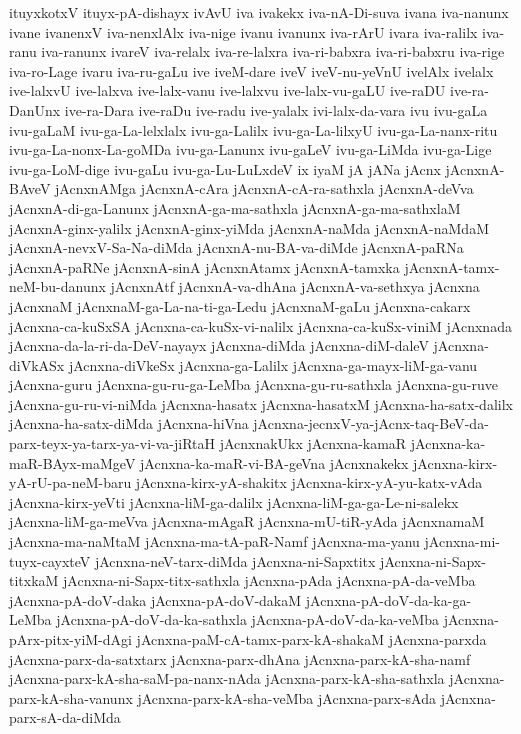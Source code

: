 {ituyxkotxV
ituyx-pA-dishayx
ivAvU
iva
ivakekx
iva-nA-Di-suva
ivana
iva-nanunx
ivane
ivanenxV
iva-nenxlAlx
iva-nige
ivanu
ivanunx
iva-rArU
ivara
iva-ralilx
iva-ranu
iva-ranunx
ivareV
iva-relalx
iva-re-lalxra
iva-ri-babxra
iva-ri-babxru
iva-rige
iva-ro-Lage
ivaru
iva-ru-gaLu
ive
iveM-dare
iveV
iveV-nu-yeVnU
ivelAlx
ivelalx
ive-lalxvU
ive-lalxva
ive-lalx-vanu
ive-lalxvu
ive-lalx-vu-gaLU
ive-raDU
ive-ra-DanUnx
ive-ra-Dara
ive-raDu
ive-radu
ive-yalalx
ivi-lalx-da-vara
ivu
ivu-gaLa
ivu-gaLaM
ivu-ga-La-lelxlalx
ivu-ga-Lalilx
ivu-ga-La-lilxyU
ivu-ga-La-nanx-ritu
ivu-ga-La-nonx-La-goMDa
ivu-ga-Lanunx
ivu-gaLeV
ivu-ga-LiMda
ivu-ga-Lige
ivu-ga-LoM-dige
ivu-gaLu
ivu-ga-Lu-LuLxdeV
ix
iyaM
jA
jANa
jAcnx
jAcnxnA-BAveV
jAcnxnAMga
jAcnxnA-cAra
jAcnxnA-cA-ra-sathxla
jAcnxnA-deVva
jAcnxnA-di-ga-Lanunx
jAcnxnA-ga-ma-sathxla
jAcnxnA-ga-ma-sathxlaM
jAcnxnA-ginx-yalilx
jAcnxnA-ginx-yiMda
jAcnxnA-naMda
jAcnxnA-naMdaM
jAcnxnA-nevxV-Sa-Na-diMda
jAcnxnA-nu-BA-va-diMde
jAcnxnA-paRNa
jAcnxnA-paRNe
jAcnxnA-sinA
jAcnxnAtamx
jAcnxnA-tamxka
jAcnxnA-tamx-neM-bu-danunx
jAcnxnAtf
jAcnxnA-va-dhAna
jAcnxnA-va-sethxya
jAcnxna
jAcnxnaM
jAcnxnaM-ga-La-na-ti-ga-Ledu
jAcnxnaM-gaLu
jAcnxna-cakarx
jAcnxna-ca-kuSxSA
jAcnxna-ca-kuSx-vi-nalilx
jAcnxna-ca-kuSx-viniM
jAcnxnada
jAcnxna-da-la-ri-da-DeV-nayayx
jAcnxna-diMda
jAcnxna-diM-daleV
jAcnxna-diVkASx
jAcnxna-diVkeSx
jAcnxna-ga-Lalilx
jAcnxna-ga-mayx-liM-ga-vanu
jAcnxna-guru
jAcnxna-gu-ru-ga-LeMba
jAcnxna-gu-ru-sathxla
jAcnxna-gu-ruve
jAcnxna-gu-ru-vi-niMda
jAcnxna-hasatx
jAcnxna-hasatxM
jAcnxna-ha-satx-dalilx
jAcnxna-ha-satx-diMda
jAcnxna-hiVna
jAcnxna-jecnxV-ya-jAcnx-taq-BeV-da-parx-teyx-ya-tarx-ya-vi-va-jiRtaH
jAcnxnakUkx
jAcnxna-kamaR
jAcnxna-ka-maR-BAyx-maMgeV
jAcnxna-ka-maR-vi-BA-geVna
jAcnxnakekx
jAcnxna-kirx-yA-rU-pa-neM-baru
jAcnxna-kirx-yA-shakitx
jAcnxna-kirx-yA-yu-katx-vAda
jAcnxna-kirx-yeVti
jAcnxna-liM-ga-dalilx
jAcnxna-liM-ga-ga-Le-ni-salekx
jAcnxna-liM-ga-meVva
jAcnxna-mAgaR
jAcnxna-mU-tiR-yAda
jAcnxnamaM
jAcnxna-ma-naMtaM
jAcnxna-ma-tA-paR-Namf
jAcnxna-ma-yanu
jAcnxna-mi-tuyx-cayxteV
jAcnxna-neV-tarx-diMda
jAcnxna-ni-Sapxtitx
jAcnxna-ni-Sapx-titxkaM
jAcnxna-ni-Sapx-titx-sathxla
jAcnxna-pAda
jAcnxna-pA-da-veMba
jAcnxna-pA-doV-daka
jAcnxna-pA-doV-dakaM
jAcnxna-pA-doV-da-ka-ga-LeMba
jAcnxna-pA-doV-da-ka-sathxla
jAcnxna-pA-doV-da-ka-veMba
jAcnxna-pArx-pitx-yiM-dAgi
jAcnxna-paM-cA-tamx-parx-kA-shakaM
jAcnxna-parxda
jAcnxna-parx-da-satxtarx
jAcnxna-parx-dhAna
jAcnxna-parx-kA-sha-namf
jAcnxna-parx-kA-sha-saM-pa-nanx-nAda
jAcnxna-parx-kA-sha-sathxla
jAcnxna-parx-kA-sha-vanunx
jAcnxna-parx-kA-sha-veMba
jAcnxna-parx-sAda
jAcnxna-parx-sA-da-diMda
}
